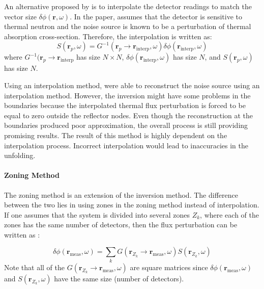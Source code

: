 An alternative proposed by \cite{demaziereIdentificationLocalizationAbsorbers2005} is to interpolate the detector readings to match the vector size $\delta \phi (\textbf{r},\omega)$. In the paper, \cite{demaziereIdentificationLocalizationAbsorbers2005} assumes that the detector is sensitive to thermal neutron and the noise source is known to be a perturbation of thermal absorption cross-section. Therefore, the interpolation is written as:
\begin{equation}
    S(\textbf{r}_p, \omega) = G^{-1}(\textbf{r}_p \rightarrow \textbf{r}_{\text{interp}}, \omega) \delta \phi (\textbf{r}_{\text{interp}},\omega) 
    \label{eq:source_inversion_matrix2}
\end{equation}
where $G^{-1}(\textbf{r}_p \rightarrow \textbf{r}_{\text{interp}}$ has size $N \times N$, $\delta \phi (\textbf{r}_{\text{interp}},\omega)$ has size $N$, and $S(\textbf{r}_p, \omega)$ has size $N$.

Using an interpolation method, \cite{demaziereIdentificationLocalizationAbsorbers2005} were able to reconstruct the noise source using an interpolation method. However, the inversion might have some problems in the boundaries because the interpolated thermal flux perturbation is forced to be equal to zero outside the reflector nodes. Even though the reconstruction at the boundaries produced poor approximation, the overall process is still providing promising results. The result of this method is highly dependent on the interpolation process. Incorrect interpolation would lead to inaccuracies in the unfolding.

\paragraph{Zoning Method}

The zoning method is an extension of the inversion method. The difference between the two lies in using zones in the zoning method instead of interpolation. If one assumes that the system is divided into several zones $Z_k$, where each of the zones has the same number of detectors, then the flux perturbation can be written as \cite{demaziereIdentificationLocalizationAbsorbers2005}:

\begin{equation}
    \delta \phi (\textbf{r}_{\text{meas}},\omega) = \sum_{k} G(\textbf{r}_{Z_k} \rightarrow \textbf{r}_{\text{meas}}, \omega) S(\textbf{r}_{Z_k}, \omega)
    \label{eq:zoning_definition}
\end{equation}
Note that all of the $G(\textbf{r}_{Z_k} \rightarrow \textbf{r}_{\text{meas}}, \omega)$ are square matrices since $\delta \phi (\textbf{r}_{\text{meas}},\omega)$ and $S(\textbf{r}_{Z_k}, \omega)$ have the same size (number of detectors).

